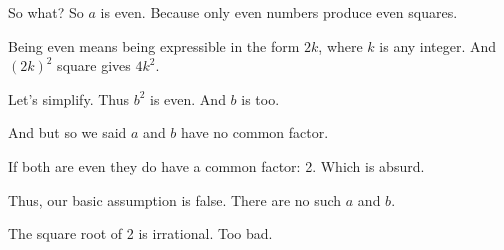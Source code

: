 \documentclass{article}
\def\i{\vskip14pt\quitvmode\llap{\itemsymbol\kern.5em}}
\begin{document}
\endslide


\begin{slide}
  \inputminted[fontsize=\small]{kotlin}{source/fizzbuzz.kt}
\end{slide}




\i So what?
\i So $a$ is even. Because only even numbers produce even squares.

\i Being even means being expressible in the form $2k$, where $k$ is
any integer.
\i And $(2k)^2$ square gives $4k^2$.

\i Let's simplify.
\i Thus $b^2$ is even.
\i And $b$ is too.

\endslide





\i And but so we said $a$ and $b$ have no common factor.

\i If both are even they do have a common factor: 2.
\i Which is absurd.

\i Thus, our basic assumption is false.
\step[A] There are no such $a$ and $b$.

\i The square root of 2 is irrational.
\step Too bad.

\endslide
\end{document}
